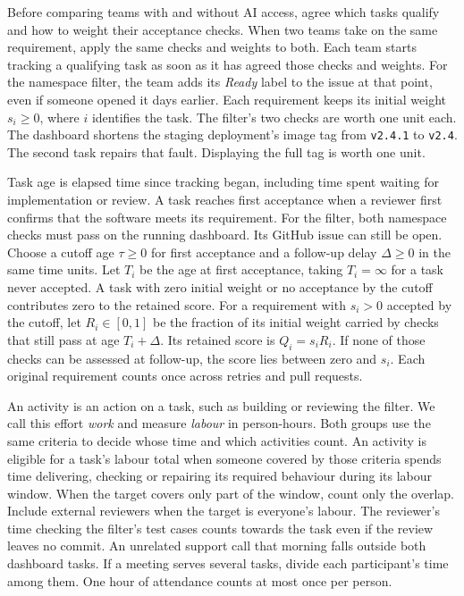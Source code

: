 \documentclass[12pt,a4paper]{amsart}
\begin{document}
Before comparing teams with and without AI access, agree which tasks qualify and how to weight their acceptance checks. When two teams take on the same requirement, apply the same checks and weights to both. Each team starts tracking a qualifying task as soon as it has agreed those checks and weights. For the namespace filter, the team adds its \emph{Ready} label to the issue at that point, even if someone opened it days earlier. Each requirement keeps its initial weight $s_i\ge 0$, where $i$ identifies the task. The filter's two checks are worth one unit each. The dashboard shortens the staging deployment's image tag from \texttt{v2.4.1} to \texttt{v2.4}. The second task repairs that fault. Displaying the full tag is worth one unit.

Task age is elapsed time since tracking began, including time spent waiting for implementation or review. A task reaches first acceptance when a reviewer first confirms that the software meets its requirement. For the filter, both namespace checks must pass on the running dashboard. Its GitHub issue can still be open. Choose a cutoff age $\tau\ge 0$ for first acceptance and a follow-up delay $\Delta\ge 0$ in the same time units. Let $T_i$ be the age at first acceptance, taking $T_i=\infty$ for a task never accepted. A task with zero initial weight or no acceptance by the cutoff contributes zero to the retained score. For a requirement with $s_i>0$ accepted by the cutoff, let $R_i\in[0,1]$ be the fraction of its initial weight carried by checks that still pass at age $T_i+\Delta$. Its retained score is $Q_i=s_iR_i$. If none of those checks can be assessed at follow-up, the score lies between zero and $s_i$. Each original requirement counts once across retries and pull requests.

An activity is an action on a task, such as building or reviewing the filter. We call this effort \emph{work} and measure \emph{labour} in person-hours. Both groups use the same criteria to decide whose time and which activities count. An activity is eligible for a task's labour total when someone covered by those criteria spends time delivering, checking or repairing its required behaviour during its labour window. When the target covers only part of the window, count only the overlap. Include external reviewers when the target is everyone's labour. The reviewer's time checking the filter's test cases counts towards the task even if the review leaves no commit. An unrelated support call that morning falls outside both dashboard tasks. If a meeting serves several tasks, divide each participant's time among them. One hour of attendance counts at most once per person.
\end{document}
